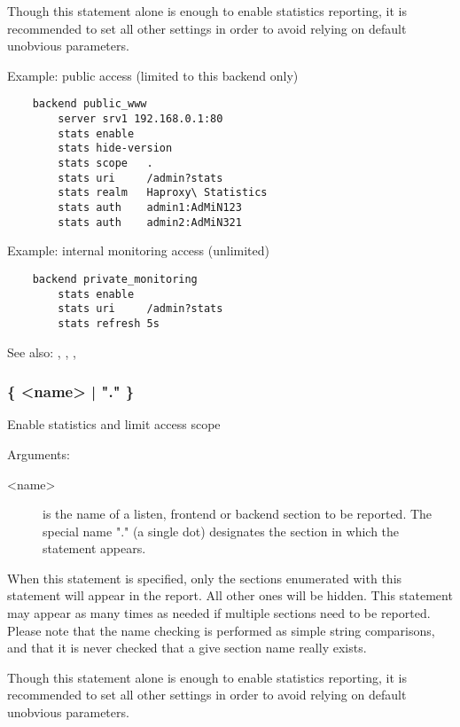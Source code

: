 {  Though this statement alone is enough to enable statistics reporting, it is
  recommended to set all other settings in order to avoid relying on default
  unobvious parameters.

  Example: public access (limited to this backend only)
  \begin{verbatim}
    backend public_www
        server srv1 192.168.0.1:80
        stats enable
        stats hide-version
        stats scope   .
        stats uri     /admin?stats
        stats realm   Haproxy\ Statistics
        stats auth    admin1:AdMiN123
        stats auth    admin2:AdMiN321
   \end{verbatim}

   Example: internal monitoring access (unlimited)
   \begin{verbatim}
    backend private_monitoring
        stats enable
        stats uri     /admin?stats
        stats refresh 5s
   \end{verbatim}

  See also: , , , 

\subsubsection[stats scope]{ \{ <name> | "." \}}

  Enable statistics and limit access scope


  Arguments:
  \begin{description}
  \item[<name>] is the name of a listen, frontend or backend section to be
              reported. The special name "." (a single dot) designates the
              section in which the statement appears.
  \end{description}

  When this statement is specified, only the sections enumerated with this
  statement will appear in the report. All other ones will be hidden. This
  statement may appear as many times as needed if multiple sections need to be
  reported. Please note that the name checking is performed as simple string
  comparisons, and that it is never checked that a give section name really
  exists.

  Though this statement alone is enough to enable statistics reporting, it is
  recommended to set all other settings in order to avoid relying on default
  unobvious parameters.

}

